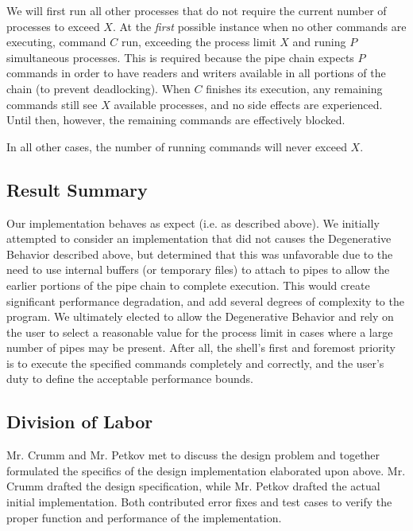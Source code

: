 \documentclass[paper=letter, fontsize=11pt]{scrartcl} %
\begin{document}
We will first run all other processes that do not require the current number of processes to exceed $X$. At the \emph{first} possible instance when no other commands are executing, command $C$ run, exceeding the process limit $X$ and runing $P$ simultaneous processes. This is required because the pipe chain expects $P$ commands in order to have readers and writers available in all portions of the chain (to prevent deadlocking). When $C$ finishes its execution, any remaining commands still see $X$ available processes, and no side effects are experienced. Until then, however, the remaining commands are effectively blocked.

In all other cases, the number of running commands will never exceed $X$.

\subsection{Result Summary}
Our implementation behaves as expect (i.e. as described above). We initially attempted to consider an implementation that did not causes the Degenerative Behavior described above, but determined that this was unfavorable due to the need to use internal buffers (or temporary files) to attach to pipes to allow the earlier portions of the pipe chain to complete execution. This would create significant performance degradation, and add several degrees of complexity to the program. We ultimately elected to allow the Degenerative Behavior and rely on the user to select a reasonable value for the process limit in cases where a large number of pipes may be present. After all, the shell's first and foremost priority is to execute the specified commands completely and correctly, and the user's duty to define the acceptable performance bounds.

\subsection{Division of Labor}
Mr. Crumm and Mr. Petkov met to discuss the design problem and together formulated the specifics of the design implementation elaborated upon above. Mr. Crumm drafted the design specification, while Mr. Petkov drafted the actual initial implementation. Both contributed error fixes and test cases to verify the proper function and performance of the implementation.

\end{document}
